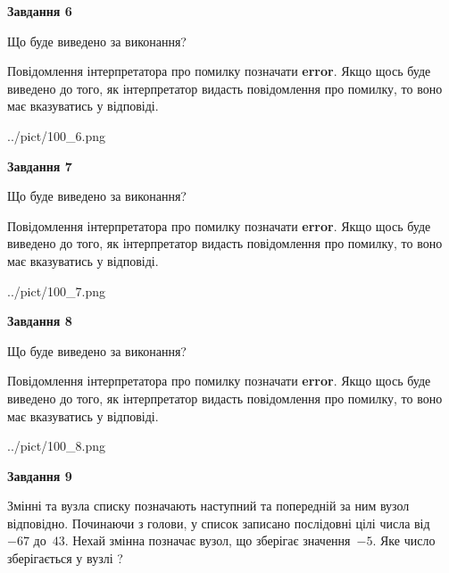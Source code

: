 \documentclass[12pt, ukrainian]{article}
\begin{document}
{\begin {large}
{\begin {center}\textbf{Завдання 6}\end {center}}\par
Що буде виведено за виконання?

Повідомлення інтерпретатора про помилку позначати \textbf{error}.
Якщо щось буде виведено до того, як інтерпретатор видасть повідомлення про помилку, 
то воно має вказуватись у відповіді. \par


\begin{center}
	{../pict/100_6.png}
\end{center}
\newpage

{\begin {center}\textbf{Завдання 7}\end {center}}\par
Що буде виведено за виконання?

Повідомлення інтерпретатора про помилку позначати \textbf{error}.
Якщо щось буде виведено до того, як інтерпретатор видасть повідомлення про помилку, 
то воно має вказуватись у відповіді. \par


\begin{center}
	{../pict/100_7.png}
\end{center}
\newpage

{\begin {center}\textbf{Завдання 8}\end {center}}\par
Що буде виведено за виконання?

Повідомлення інтерпретатора про помилку позначати \textbf{error}.
Якщо щось буде виведено до того, як інтерпретатор видасть повідомлення про помилку, 
то воно має вказуватись у відповіді. \par


\begin{center}
	{../pict/100_8.png}
\end{center}
\newpage

{\begin {center}\textbf{Завдання 9}\end {center}}\par
Змінні  та  вузла списку позначають наступний та попередній за ним вузол відповідно. Починаючи з голови, у список записано послідовні цілі числа від~$-67$ до~$43$. Нехай змінна  позначає вузол, що зберігає значення~$-5$.
Яке число зберігається у вузлі  ?\par
\newpage


\end{large}}
\end{document}
